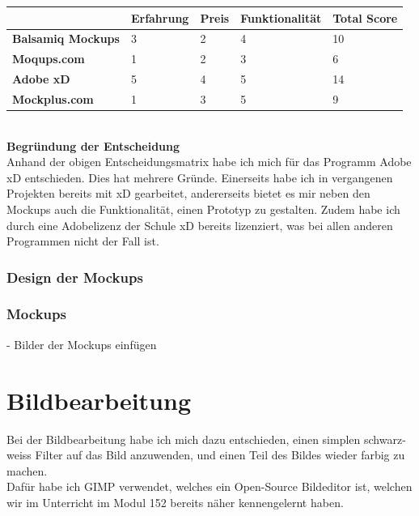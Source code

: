 \documentclass[11pt]{article}
\begin{document}
    \begin{center}
        \begin{tabular}{ | p{4cm} | p{2.5cm} | p{2.5cm} | p{3cm} | p{2.5cm} | }
            \hline
            & \textbf{Erfahrung} & \textbf{Preis} & \textbf{Funktionalität} & \textbf{Total Score} \\ \hline
            \textbf{Balsamiq Mockups} & 3                  & 2              & 4                       & 10                   \\ \hline
            \textbf{Moqups.com}       & 1                  & 2              & 3                       & 6                    \\ \hline
            \textbf{Adobe xD}         & 5                  & 4              & 5                       & 14                   \\ \hline
            \textbf{Mockplus.com}     & 1                  & 3              & 5                       & 9                    \\ \hline
        \end{tabular}
    \end{center}
    \\
    \textbf{Begründung der Entscheidung}\\
    Anhand der obigen Entscheidungsmatrix habe ich mich für das Programm Adobe xD entschieden. Dies hat mehrere
    Gründe. Einerseits habe ich in vergangenen Projekten bereits mit xD gearbeitet, andererseits bietet es
    mir neben den Mockups auch die Funktionalität, einen Prototyp zu gestalten. Zudem habe ich durch eine
    Adobelizenz der Schule xD bereits lizenziert, was bei allen anderen Programmen nicht der Fall ist.

    \subsubsection{Design der Mockups}

    \subsubsection{Mockups}
    - Bilder der Mockups einfügen

    \section{Bildbearbeitung}
    Bei der Bildbearbeitung habe ich mich dazu entschieden, einen simplen schwarz-weiss Filter auf das Bild
    anzuwenden, und einen Teil des Bildes wieder farbig zu machen.\\
    Dafür habe ich GIMP verwendet, welches ein Open-Source Bildeditor ist, welchen wir im Unterricht im Modul
    152 bereits näher kennengelernt haben.
\end{document}
